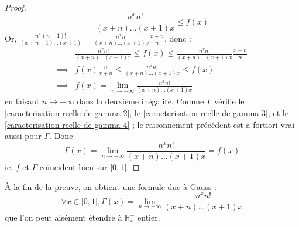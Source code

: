 \begin{proof}
    \[ \frac{n^x n!}{(x+n) \dots (x+1)x} \leq f(x) \]
    Or, $\frac{n^x (n-1)!}{(x+n-1) \dots (x+1)} = \frac{n^x n!}{(x+n) \dots (x+1)x} \frac{x+n}{n}$, donc :
    \begin{align*}
      &\frac{n^x n!}{(x+n) \dots (x+1)x} \leq f(x) \leq \frac{n^x n!}{(x+n) \dots (x+1)x} \frac{x+n}{n} \\
      \implies & f(x) \frac{n}{x+n} \leq \frac{n^x n!}{(x+n) \dots (x+1)x} \leq f(x) \\
      \implies & f(x) = \lim_{n \rightarrow +\infty} \frac{n^x n!}{(x+n) \dots (x+1)x}
    \end{align*}
    en faisant $n \longrightarrow +\infty$ dans la deuxième inégalité. Comme $\Gamma$ vérifie le \cref{caracterisation-reelle-de-gamma-2}, le \cref{caracterisation-reelle-de-gamma-3}, et le \cref{caracterisation-reelle-de-gamma-4} ; le raisonnement précédent est a fortiori vrai aussi pour $\Gamma$. Donc
    \[ \Gamma(x) = \lim_{n \rightarrow +\infty} \frac{n^x n!}{(x+n) \dots (x+1)x} = f(x)  \]
    ie. $f$ et $\Gamma$ coïncident bien sur $]0, 1]$.
  \end{proof}

  \begin{remark}
    À la fin de la preuve, on obtient une formule due à Gauss :
    \[ \forall x \in ]0, 1], \Gamma(x) = \lim_{n \rightarrow +\infty} \frac{n^x n!}{(x+n) \dots (x+1)x} \]
    que l'on peut aisément étendre à $\mathbb{R}^+_*$ entier.
  \end{remark}

